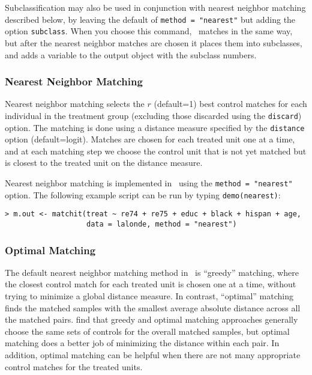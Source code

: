 Subclassification may also be used in conjunction with nearest
neighbor matching described below, by leaving the default of
\texttt{method = "nearest"} but adding the option \texttt{subclass}.
When you choose this command, \MatchIt\ matches in the same way, but
after the nearest neighbor matches are chosen it places them into
subclasses, and adds a variable to the output object with the subclass
numbers.

\subsubsection{Nearest Neighbor Matching}
\label{subsubsec:nearest}

Nearest neighbor matching selects the $r$ (default=1) best control
matches for each individual in the treatment group (excluding those
discarded using the \texttt{discard}) option.  The matching is done
using a distance measure specified by the {\tt distance} option
(default=logit).  Matches are chosen for each treated unit one at a
time, and at each matching step we choose the control unit that is not
yet matched but is closest to the treated unit on the distance
measure.

Nearest neighbor matching is implemented in \MatchIt\ using the
\texttt{method = "nearest"} option.  The following example script can
be run by typing {\tt demo(nearest)}:
\begin{verbatim}
> m.out <- matchit(treat ~ re74 + re75 + educ + black + hispan + age, 
                   data = lalonde, method = "nearest")
\end{verbatim}

\subsubsection{Optimal Matching}
\label{subsubsec:optimal}

The default nearest neighbor matching method in \MatchIt\ is
``greedy'' matching, where the closest control match for each treated
unit is chosen one at a time, without trying to minimize a global
distance measure.  In contrast, ``optimal'' matching finds the matched
samples with the smallest average absolute distance across all the
matched pairs.  \citet{GuRos93} find that greedy and optimal matching
approaches generally choose the same sets of controls for the overall
matched samples, but optimal matching does a better job of minimizing
the distance within each pair.  In addition, optimal matching can be
helpful when there are not many appropriate control matches for the
treated units.

